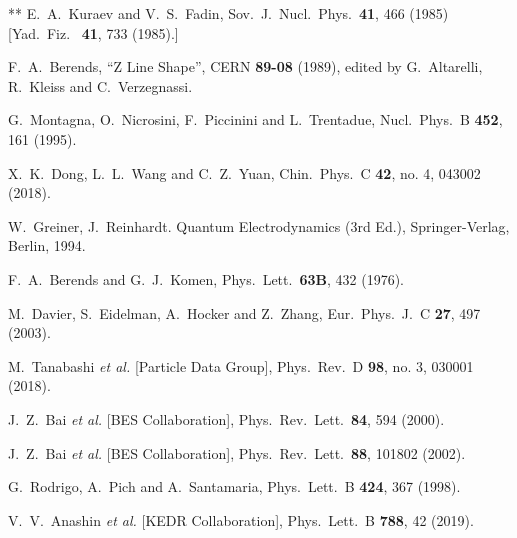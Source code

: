 \documentclass[aps,showpacs,superscriptaddress,preprint,tightenlines]{revtex4}
\begin{document}
\begin{thebibliography}{**}
 E.~A.~Kuraev and V.~S.~Fadin,
Sov.\ J.\ Nucl.\ Phys.\ {\bf 41}, 466 (1985) [Yad.\ Fiz.\ {\bf
41}, 733 (1985).]

F.~A.~Berends, ``Z Line Shape'',
          CERN {\bf 89-08} (1989), edited by G.~Altarelli,
          R.~Kleiss and C.~Verzegnassi.

  G.~Montagna, O.~Nicrosini, F.~Piccinini and L.~Trentadue,
  Nucl.\ Phys.\ B {\bf 452}, 161 (1995).
  
  X.~K.~Dong, L.~L.~Wang and C.~Z.~Yuan,
  Chin.\ Phys.\ C {\bf 42}, no. 4, 043002 (2018).
  
W.~Greiner, J.~Reinhardt.
Quantum Electrodynamics (3rd Ed.), Springer-Verlag, Berlin, 1994.

 F.~A.~Berends and G.~J.~Komen,
  Phys.\ Lett.\  {\bf 63B}, 432 (1976).

M.~Davier, S.~Eidelman, A.~Hocker and Z.~Zhang,
Eur.\ Phys.\ J.\ C {\bf 27}, 497 (2003).

  M.~Tanabashi {\it et al.} [Particle Data Group],
  Phys.\ Rev.\ D {\bf 98}, no. 3, 030001 (2018).

J.~Z.~Bai {\it et al.}  [BES Collaboration],
Phys.\ Rev.\ Lett.\  {\bf 84}, 594 (2000).

J.~Z.~Bai {\it et al.}  [BES Collaboration],
Phys.\ Rev.\ Lett.\  {\bf 88}, 101802 (2002).

G.~Rodrigo, A.~Pich and A.~Santamaria,
Phys.\ Lett.\ B {\bf 424}, 367 (1998).

  V.~V.~Anashin {\it et al.} [KEDR Collaboration],
  Phys.\ Lett.\ B {\bf 788}, 42 (2019).
  

\end{thebibliography}
\end{document}
